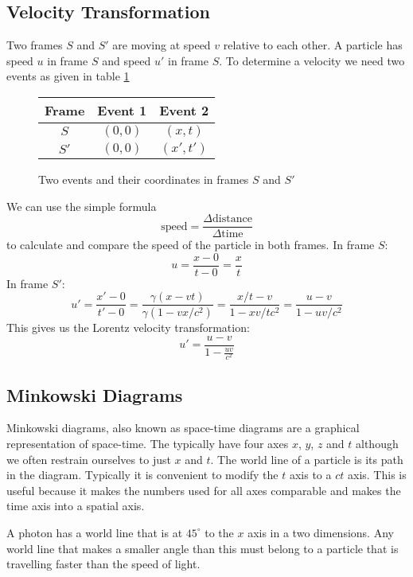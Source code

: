 \documentclass{article}
\begin{document}
    \subsection{Velocity Transformation}
    Two frames \(S\) and \(S'\) are moving at speed \(v\) relative to each other.
    A particle has speed \(u\) in frame \(S\) and speed \(u'\) in frame \(S\).
    To determine a velocity we need two events as given in table \ref{fig:lorentz velocity transform events}
    \begin{figure}[ht]
        \centering
        \begin{tabular}{c|cc}
            Frame & Event 1 & Event 2\\ \hline
            \(S\) & \((0, 0)\) & \((x, t)\) \\
            \(S'\) & \((0, 0)\) & \((x', t')\)
        \end{tabular}
        \caption{Two events and their coordinates in frames \(S\) and \(S'\)}
        \label{fig:lorentz velocity transform events}
    \end{figure}
    We can use the simple formula
    \[\text{speed} = \frac{\Delta\text{distance}}{\Delta\text{time}}\]
    to calculate and compare the speed of the particle in both frames.
    In frame \(S\):
    \[u = \frac{x - 0}{t - 0} = \frac{x}{t}\]
    In frame \(S'\):
    \[u' = \frac{x' - 0}{t' - 0} = \frac{\gamma(x - vt)}{\gamma(1 - vx/c^2)} = \frac{x/t - v}{1 - xv/tc^2} = \frac{u-v}{1-uv/c^2}\]
    This gives us the Lorentz velocity transformation:
    \[u' = \frac{u - v}{1 - \frac{uv}{c^2}}\]
    
    \subsection{Minkowski Diagrams}
    Minkowski diagrams, also known as space-time diagrams are a graphical representation of space-time.
    The typically have four axes \(x\), \(y\), \(z\) and \(t\) although we often restrain ourselves to just \(x\) and \(t\).
    The world line of a particle is its path in the diagram.
    Typically it is convenient to modify the \(t\) axis to a \(ct\) axis.
    This is useful because it makes the numbers used for all axes comparable and makes the time axis into a spatial axis.
    
    A photon has a world line that is at \(45^\circ\) to the \(x\) axis in a two dimensions. 
    Any world line that makes a smaller angle than this must belong to a particle that is travelling faster than the speed of light.
    
\end{document}
